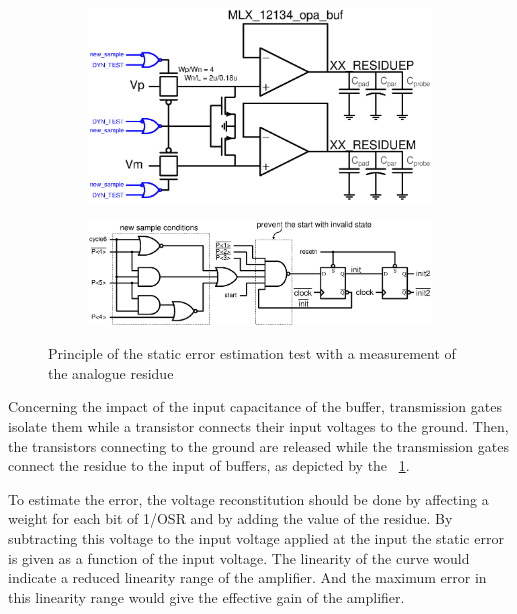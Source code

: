 \begin{figure}[htp]
    \centering
    \begin{subfigure}[b]{0.48\textwidth}
        \centering
        \includegraphics[width=\textwidth]{Chapter5/Figs/adc_chip/residuum_measurement_dyn_test.ps}
    \end{subfigure}
    \begin{subfigure}[b]{0.48\textwidth}
        \centering
        \includegraphics[width=\textwidth]{Chapter5/Figs/adc_chip/digital-new-sample.ps}
        \vspace{2em}
    \end{subfigure}
    \caption{Principle of the static error estimation test with a measurement of the analogue residue}
    \label{fig:adc-static-test-buffers-clocking}
\end{figure}

Concerning the impact of the input capacitance of the buffer, transmission gates isolate them while a transistor connects their input voltages to the ground. Then, the transistors connecting to the ground are released while the transmission gates connect the residue to the input of buffers, as depicted by the \figurename~\ref{fig:adc-static-test-buffers-clocking}.

To estimate the error, the voltage reconstitution should be done by affecting a weight for each bit of 1/OSR and by adding the value of the residue. By subtracting this voltage to the input voltage applied at the input the static error is given as a function of the input voltage. The linearity of the curve would indicate a reduced linearity range of the amplifier. And the maximum error in this linearity range would give the effective gain of the amplifier.

